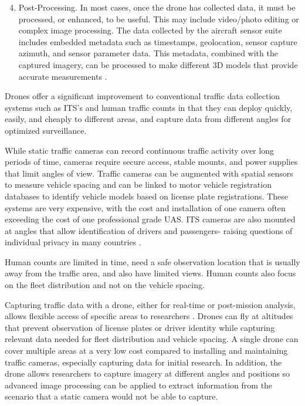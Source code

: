 \begin{enumerate}
\setcounter{enumi}{3}
\item Post-Processing. In most cases, once the drone has collected data, it must be processed, or enhanced, to be useful. This may include video/photo editing or complex image processing. The data collected by the aircraft sensor suite includes embedded metadata such as timestamps, geolocation, sensor capture azimuth, and sensor parameter data. This metadata, combined with the captured imagery, can be processed to make different 3D models that provide accurate measurements \citep{Sona2014}. 
\end{enumerate}

Drones offer a significant improvement to conventional traffic data collection systems such as ITS's and human traffic counts in that they can deploy quickly, easily, and cheaply to different areas, and capture data from different angles for optimized surveillance. 

While static traffic cameras can record continuous traffic activity over long periods of time, cameras require secure access, stable mounts, and power supplies that limit angles of view. Traffic cameras can be augmented with spatial sensors to measure vehicle spacing and can be linked to motor vehicle registration databases to identify vehicle models based on license plate registrations. These systems are very expensive, with the cost and installation of one camera often exceeding the cost of one professional grade UAS. ITS cameras are also mounted at angles that allow identification of drivers and passengers- raising questions of individual privacy in many countries \citep{Polak2017}.

Human counts are limited in time, need a safe observation location that is usually away from the traffic area, and also have limited views. Human counts also focus on the fleet distribution and not on the vehicle spacing. 

Capturing traffic data with a drone, either for real-time or post-mission analysis, allows flexible access of specific areas to researchers \citep{Westoby2012}. Drones can fly at altitudes that prevent observation of license plates or driver identity while capturing relevant data needed for fleet distribution and vehicle spacing. A single drone can cover multiple areas at a very low cost compared to installing and maintaining traffic cameras, especially capturing data for initial research. In addition, the drone allows researchers to capture imagery at different angles and positions so advanced image processing can be applied to extract information from the scenario that a static camera would not be able to capture.

